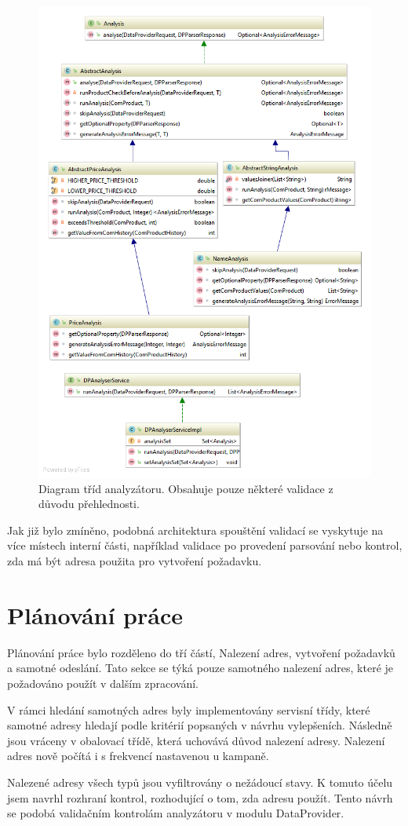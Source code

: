 \documentclass[thesis=B,czech]{FITthesis}[2012/06/26]
\begin{document}
\begin{figure}\centering
 	\includegraphics[width=1.0\textwidth]{resources/analyser-classes}
	\caption[Diagram tříd analyzátoru]{Diagram tříd analyzátoru. Obsahuje pouze některé validace z důvodu přehlednosti.}\label{fig:analyser-classes}
\end{figure}


Jak již bylo zmíněno, podobná architektura spouštění validací se vyskytuje na více místech interní části, například validace po provedení
parsování nebo kontrol, zda má být adresa použita pro vytvoření požadavku.


\section{Plánování práce}\label{ch:planning}
Plánování práce bylo rozděleno do tří částí, Nalezení adres, vytvoření požadavků a samotné odeslání.
Tato sekce se týká pouze samotného nalezení adres, které je požadováno použít v dalším zpracování.
\par
V rámci hledání samotných adres byly implementovány servisní třídy, které samotné adresy hledají podle kritérií popsaných v 
návrhu vylepšeních. Následně jsou vráceny v obalovací třídě, která uchovává důvod nalezení adresy. Nalezení adres nově počítá i s frekvencí nastavenou u kampaně.
\par
Nalezené adresy všech typů jsou vyfiltrovány o nežádoucí stavy. K tomuto účelu jsem navrhl rozhraní kontrol, rozhodující 
o tom, zda adresu použít. Tento návrh se podobá validačním kontrolám analyzátoru v modulu DataProvider.
\end{document}
